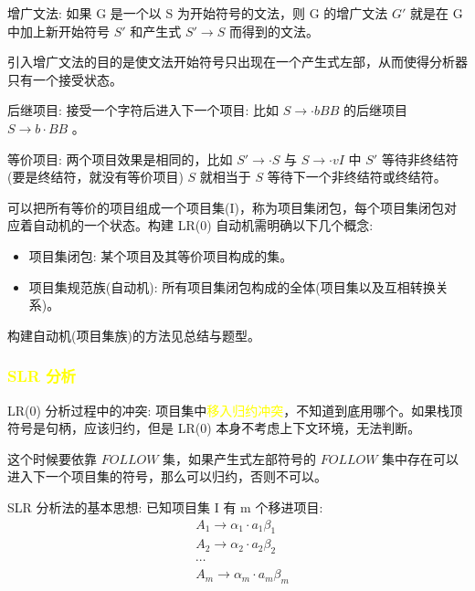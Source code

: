 增广文法: 如果 G 是一个以 S 为开始符号的文法，则 G 的增广文法 $G'$ 就是在 G 中加上新开始符号 $S'$ 和产生式 $S' \rightarrow S$ 而得到的文法。

引入增广文法的目的是使文法开始符号只出现在一个产生式左部，从而使得分析器只有一个接受状态。

后继项目: 接受一个字符后进入下一个项目: 比如 $ S \rightarrow \cdot bBB $ 的后继项目 $S \rightarrow b\cdot BB$ 。

等价项目: 两个项目效果是相同的，比如 $S' \rightarrow \cdot S$ 与 $S \rightarrow \cdot vI$ 中 $S'$ 等待非终结符(要是终结符，就没有等价项目) $S$ 就相当于 $S$ 等待下一个非终结符或终结符。

可以把所有等价的项目组成一个项目集(I)，称为项目集闭包，每个项目集闭包对应着自动机的一个状态。构建 LR(0) 自动机需明确以下几个概念:
\begin{itemize}
    \item 项目集闭包: 某个项目及其等价项目构成的集。
    \item 项目集规范族(自动机): 所有项目集闭包构成的全体(项目集以及互相转换关系)。
\end{itemize}

构建自动机(项目集族)的方法见总结与题型。

\subsubsection{\textcolor{mark}{SLR 分析}}

LR(0) 分析过程中的冲突: 项目集中\textcolor{mark}{移入归约冲突}，不知道到底用哪个。如果栈顶符号是句柄，应该归约，但是 LR(0) 本身不考虑上下文环境，无法判断。

这个时候要依靠 $FOLLOW$ 集，\textcolor{imp}{如果产生式左部符号的 $FOLLOW$ 集中存在可以进入下一个项目集的符号，那么可以归约，否则不可以。}

SLR 分析法的基本思想:
已知项目集 I 有 m 个移进项目:
\begin{equation}
    \begin{aligned}
         & A_1 \rightarrow \alpha_1 \cdot a_1 \beta_1 \\
         & A_2 \rightarrow \alpha_2 \cdot a_2 \beta_2 \\
         & \cdots                                     \\
         & A_m \rightarrow \alpha_m \cdot a_m \beta_m \\
         & \nonumber
    \end{aligned}
\end{equation}


